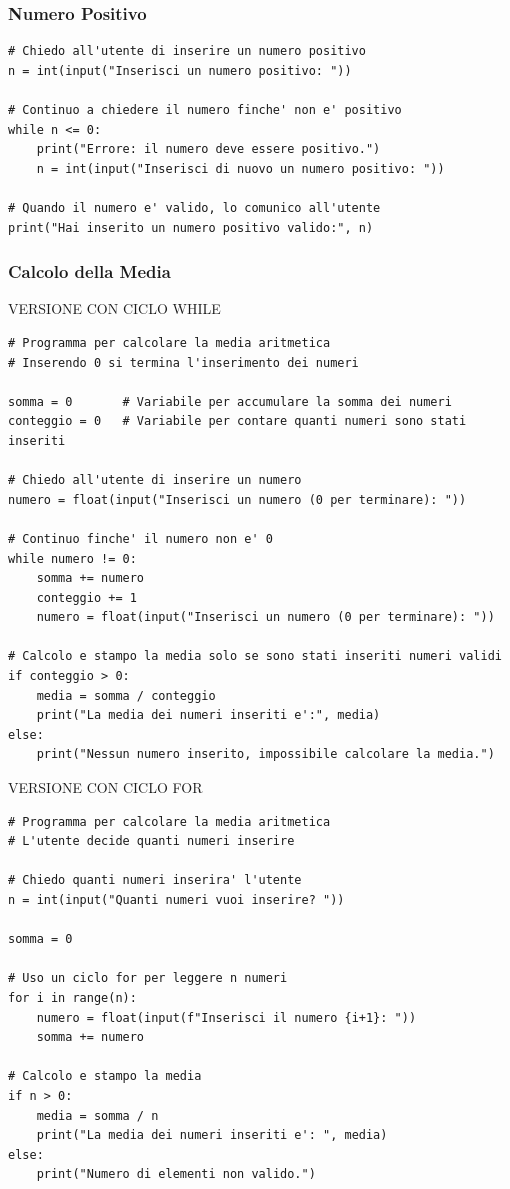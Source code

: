 \documentclass[a4paper,12pt]{article}
\begin{document}
\newpage
\subsubsection{Numero Positivo}
\begin{lstlisting}
# Chiedo all'utente di inserire un numero positivo
n = int(input("Inserisci un numero positivo: "))

# Continuo a chiedere il numero finche' non e' positivo
while n <= 0:
	print("Errore: il numero deve essere positivo.")
	n = int(input("Inserisci di nuovo un numero positivo: "))

# Quando il numero e' valido, lo comunico all'utente
print("Hai inserito un numero positivo valido:", n)

\end{lstlisting}


\newpage
\subsubsection{Calcolo della Media}
VERSIONE CON CICLO WHILE
\begin{lstlisting}
# Programma per calcolare la media aritmetica
# Inserendo 0 si termina l'inserimento dei numeri

somma = 0       # Variabile per accumulare la somma dei numeri
conteggio = 0   # Variabile per contare quanti numeri sono stati inseriti

# Chiedo all'utente di inserire un numero
numero = float(input("Inserisci un numero (0 per terminare): "))

# Continuo finche' il numero non e' 0
while numero != 0:
	somma += numero
	conteggio += 1
	numero = float(input("Inserisci un numero (0 per terminare): "))

# Calcolo e stampo la media solo se sono stati inseriti numeri validi
if conteggio > 0:
	media = somma / conteggio
	print("La media dei numeri inseriti e':", media)
else:
	print("Nessun numero inserito, impossibile calcolare la media.")
\end{lstlisting}

VERSIONE CON CICLO FOR
\begin{lstlisting}
# Programma per calcolare la media aritmetica
# L'utente decide quanti numeri inserire

# Chiedo quanti numeri inserira' l'utente
n = int(input("Quanti numeri vuoi inserire? "))

somma = 0

# Uso un ciclo for per leggere n numeri
for i in range(n):
	numero = float(input(f"Inserisci il numero {i+1}: "))
	somma += numero

# Calcolo e stampo la media
if n > 0:
	media = somma / n
	print("La media dei numeri inseriti e': ", media)
else:
	print("Numero di elementi non valido.")

\end{lstlisting}
\end{document}
